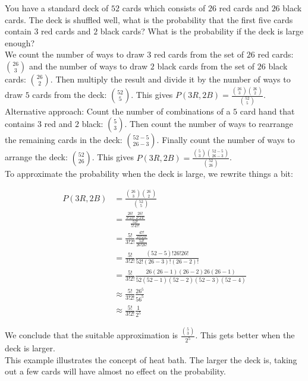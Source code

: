 \documentclass[12pt, a4paper]{article}
\newcounter{exa}
\begin{document}
\begin{texample}
You have a standard deck of $52$ cards which consists of $26$ red cards and $26$ black cards. The deck is shuffled well, what is the probability that the first five cards contain $3$ red cards and $2$ black cards? What is the probability if the deck is large enough? \\

We count the number of ways to draw $3$ red cards from the set of $26$ red cards: $\binom{26}{3}$ and the number of ways to draw $2$ black cards from the set of $26$ black cards: $\binom{26}{2}$. Then multiply the result and divide it by the number of ways to draw $5$ cards from the deck: $\binom{52}{5}$. This gives $P(3R,2B)=\frac{\binom{26}{3}\binom{26}{2}}{\binom{52}{5}}$. \\

Alternative approach: Count the number of combinations of a $5$ card hand that contains $3$ red and $2$ black: $\binom{5}{3}$. Then count the number of ways to rearrange the remaining cards in the deck: $\binom{52-5}{26-3}$. Finally count the number of ways to arrange the deck: $\binom{52}{26}$. This gives $P(3R,2B)=\frac{\binom{5}{3}\binom{52-5}{26-3}}{\binom{52}{26}}$. \\

To approximate the probability when the deck is large, we rewrite things a bit:

\begin{align*}
P(3R,2B)&=\frac{\binom{26}{3}\binom{26}{2}}{\binom{52}{5}} \\
&=\frac{\frac{26!}{3!23!}\frac{26!}{2!24!}}{\frac{52!}{5!47!}} \\
&=\frac{5!}{3!2!}\frac{\frac{47!}{23!24!}}{\frac{52!}{26!26!}} \\
&=\frac{5!}{3!2!}\frac{(52-5)!26!26!}{52!(26-3)!(26-2)!} \\
&=\frac{5!}{3!2!}\frac{26(26-1)(26-2)26(26-1)}{52(52-1)(52-2)(52-3)(52-4)} \\
&\approx \frac{5!}{3!2!}\frac{26^5}{56^5} \\
&\approx \frac{5!}{3!2!}\frac{1}{2^5}
\end{align*}

We conclude that the suitable approximation is $\frac{\binom{5}{3}}{2^5}$. This gets better when the deck is larger. \\

This example illustrates the concept of heat bath. The larger the deck is, taking out a few cards will have almost no effect on the probability.
\end{texample}
\end{document}
